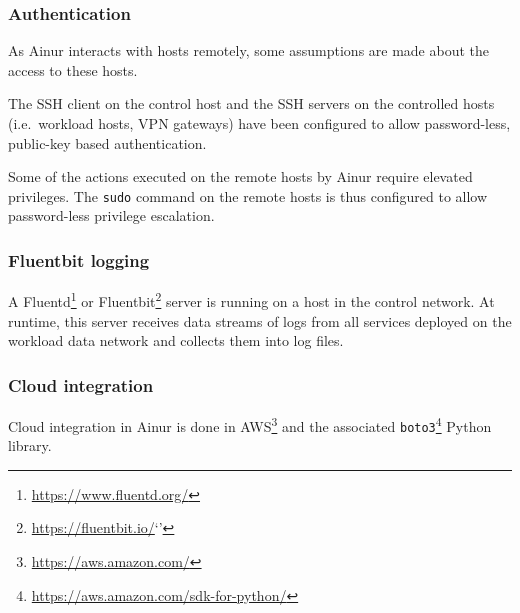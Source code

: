 \subsubsection{Authentication}
As Ainur interacts with hosts remotely, some assumptions are made about the access to these hosts.

\begin{description}[style=unboxed]
    \item[SSH access] 
    
    The \gls{SSH} client on the control host and the \gls{SSH} servers on the controlled hosts (i.e.\ workload hosts, \gls{VPN} gateways) have been configured to allow password-less, public-key based authentication.

    \item[\texttt{sudo} access]
    
    Some of the actions executed on the remote hosts by Ainur require elevated privileges.
    The \texttt{sudo} command on the remote hosts is thus configured to allow password-less privilege escalation.

\end{description} 

\subsubsection{Fluentbit logging}

A Fluentd\footnote{\url{https://www.fluentd.org/}} or Fluentbit\footnote{\url{https://fluentbit.io/}`'} server is running on a host in the control network.
At runtime, this server receives data streams of logs from all services deployed on the workload data network and collects them into log files.

\subsubsection{Cloud integration}

Cloud integration in Ainur is done in \gls{AWS}\footnote{\url{https://aws.amazon.com/}} and the associated \texttt{boto3}\footnote{\url{https://aws.amazon.com/sdk-for-python/}} Python library.

